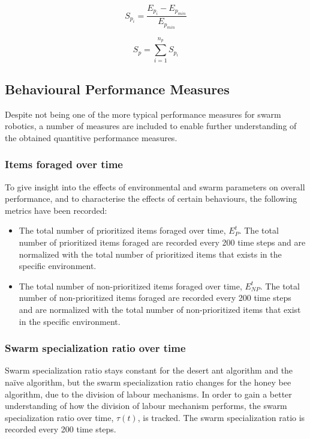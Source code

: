 \begin{equation}
	S_{p_i} = \dfrac{E_{p_{i}} - E_{p_{min}}}{E_{p_{min}}}
\end{equation}

\begin{equation}
	S_p = \sum_{i=1}^{n_p} S_{p_i}
\end{equation}

\subsection{Behavioural Performance Measures}
\label{behaviouralperformancemeasures}

Despite not being one of the more typical performance measures for swarm robotics, a number of measures are included to enable further understanding of the obtained quantitive performance measures.

\subsubsection{Items foraged over time}
To give insight into the effects of environmental and swarm parameters on overall performance, and to characterise the effects of certain behaviours, the following metrics have been recorded:

\begin{itemize}
\item The total number of prioritized items foraged over time, $E^t_P$. The total number of prioritized items foraged are recorded every 200 time steps and are normalized with the total number of prioritized items that exists in the specific environment.
\item The total number of non-prioritized items foraged over time, $E^t_{NP}$. The total number of non-prioritized items foraged are recorded every 200 time steps and are normalized with the total number of non-prioritized items that exist in the specific environment.
\end{itemize}

\subsubsection{Swarm specialization ratio over time}
Swarm specialization ratio stays constant for the desert ant algorithm and the na\"ive algorithm, but the swarm specialization ratio changes for the honey bee algorithm, due to the division of labour mechanisms. In order to gain a better understanding of how the division of labour mechanism performs, the swarm specialization ratio over time, $\tau(t)$, is tracked. The swarm specialization ratio is recorded every 200 time steps.

